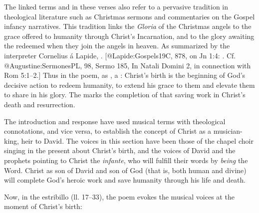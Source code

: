 The linked terms  and  in these verses also refer to a pervasive
tradition in theological literature such as Christmas sermons and commentaries
on the Gospel infancy narratives.
This tradition links the \emph{Gloria} of the Christmas angels to the grace offered
to humanity through Christ's Incarnation, and to the glory awaiting the redeemed
when they join the angels in heaven.
As summarized by the interpreter Cornelius á Lapide, . 
[@Lapide:Gospels19C, 878, on Jn 1:4:
. Cf.
@Augustine:SermonesPL, 98, Sermo 185, In Natali Domini 2, in connection with
Rom 5:1--2.]
Thus in the poem, as , a : Christ's birth is the
beginning of God's decisive action to redeem humanity, to extend his grace to
them and elevate them to share in his glory.
The  marks the completion of that saving work in Christ's death
and resurrection.

The introduction and response have used musical terms with theological
connotations, and vice versa, to establish the concept of Christ as a
musician-king, heir to David.
The voices in this section have been those of the chapel choir singing in the
present about Christ's birth, and the voices of David and the prophets pointing
to Christ the \emph{infante}, who will fulfill their words by \emph{being} the Word.
Christ as son of David and son of God (that is, both human and divine) will
complete God's heroic work and save humanity through his life and death.

Now, in the estribillo (ll. 17--33), the poem evokes the musical voices at the
moment of Christ's birth:

